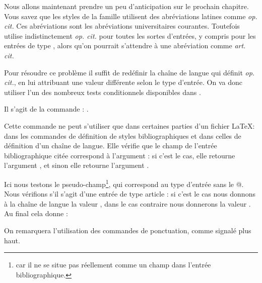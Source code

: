 Nous allons maintenant prendre un peu d'anticipation sur le prochain chapitre.
Vous savez  que les styles de la famille  utilisent des abréviations latines comme \emph{op. cit.}
Ces abréviations sont les abréviations universitaires courantes. Toutefois    utilise indistinctement \emph{op. cit.} pour toutes les sortes d'entrées, y compris pour les entrées de type , alors qu'on pourrait s'attendre à une abréviation comme \emph{art. cit.}

Pour résoudre ce problème il suffit de redéfinir la chaîne de langue qui définit \emph{op. cit.}, en lui attribuant une valeur différente selon le type d'entrée.  On va donc utiliser l'un des nombreux tests conditionnels disponibles dans . 

Il s'agit de la commande : .

Cette commande ne peut s'utiliser que dans certaines parties d'un fichier \LaTeX : dans les commandes de définition de styles bibliographiques et  dans celles de définition d'un chaîne de langue. 
Elle vérifie que le champ     de l'entrée bibliographique citée correspond à l'argument : si c'est le cas, elle retourne l'argument , et sinon elle retourne l'argument .

Ici nous testons le pseudo-champ\footnote{ car il ne se situe pas réellement comme un champ dans l'entrée bibliographique.}, qui correspond au type d'entrée sans le @. Nous vérifions  s'il s'agit d'une entrée de type article : si c'est le cas nous donnons à la chaîne de langue la valeur  ,  dans le cas contraire nous donnerons la valeur .
Au final cela donne : 

\begin{latexcode}
\end{latexcode}


On remarquera l'utilisation des commandes de ponctuation, comme signalé plus haut.



    
